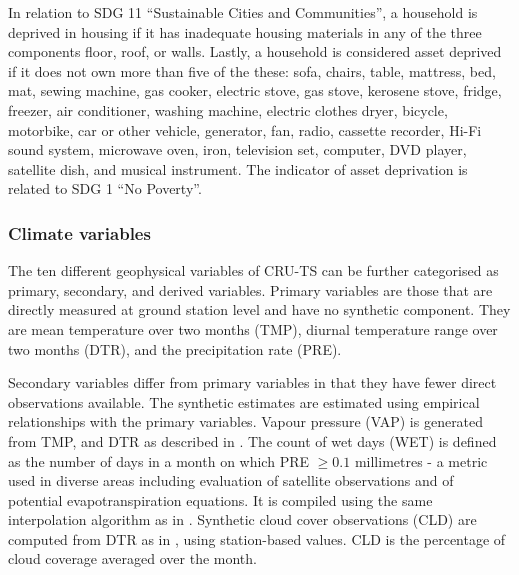 \documentclass[a4paper,12pt]{article}
\theoremstyle{plain}
\theoremstyle{definition}
\theoremstyle{definition}
\theoremstyle{definition}
\theoremstyle{definition}
\begin{document}
In relation to SDG 11 ``Sustainable Cities and Communities'', a household is deprived in housing if it has inadequate housing materials in any of the three components floor, roof, or walls. Lastly, a household is considered asset deprived if it does not own more than five of the these: sofa, chairs, table, mattress, bed, mat, sewing machine, gas cooker, electric stove, gas stove, kerosene stove, fridge, freezer, air conditioner, washing machine, electric clothes dryer, bicycle, motorbike, car or other vehicle, generator, fan, radio, cassette recorder, Hi-Fi sound system, microwave oven, iron, television set, computer, DVD player, satellite dish, and musical instrument. The indicator of asset deprivation is related to SDG 1 ``No Poverty''.

\subsubsection{Climate variables}
\label{subsub:climatevars}

The ten different geophysical variables of CRU-TS can be further categorised as primary, secondary, and derived variables. Primary variables are those that are directly measured at ground station level and have no synthetic component. They are mean temperature over two months (TMP), diurnal temperature range over two months (DTR), and the precipitation rate (PRE).

Secondary variables differ from primary variables in that they have fewer direct observations available. The synthetic estimates are estimated using empirical relationships with the primary variables. Vapour pressure (VAP) is generated from TMP, and DTR as described in \citet{harris2020}. The count of wet days (WET) is defined as the number of days in a month on which PRE $\geq0.1$ millimetres - a metric used in diverse areas including evaluation of satellite observations and of potential evapotranspiration equations. It is compiled using the same interpolation algorithm as in \citet{harris2014}. Synthetic cloud cover observations (CLD) are computed from DTR as in \citet{harris2014}, using station-based values. CLD is the percentage of cloud coverage averaged over the month.
\end{document}

